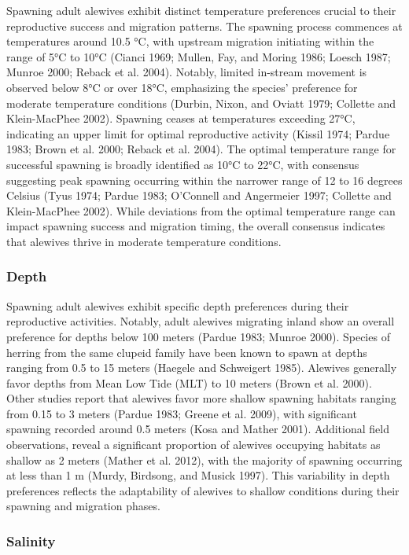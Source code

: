 \documentclass[
]{book}
\begin{document}
Spawning adult alewives exhibit distinct temperature preferences crucial to their reproductive success and migration patterns. The spawning process commences at temperatures around 10.5 °C, with upstream migration initiating within the range of 5°C to 10°C (Cianci 1969; Mullen, Fay, and Moring 1986; Loesch 1987; Munroe 2000; Reback et al. 2004). Notably, limited in-stream movement is observed below 8°C or over 18°C, emphasizing the species' preference for moderate temperature conditions (Durbin, Nixon, and Oviatt 1979; Collette and Klein-MacPhee 2002). Spawning ceases at temperatures exceeding 27°C, indicating an upper limit for optimal reproductive activity (Kissil 1974; Pardue 1983; Brown et al. 2000; Reback et al. 2004). The optimal temperature range for successful spawning is broadly identified as 10°C to 22°C, with consensus suggesting peak spawning occurring within the narrower range of 12 to 16 degrees Celsius (Tyus 1974; Pardue 1983; O'Connell and Angermeier 1997; Collette and Klein-MacPhee 2002). While deviations from the optimal temperature range can impact spawning success and migration timing, the overall consensus indicates that alewives thrive in moderate temperature conditions.

\hypertarget{depth}{%
\subsubsection{Depth}\label{depth}}

Spawning adult alewives exhibit specific depth preferences during their reproductive activities. Notably, adult alewives migrating inland show an overall preference for depths below 100 meters (Pardue 1983; Munroe 2000). Species of herring from the same clupeid family have been known to spawn at depths ranging from 0.5 to 15 meters (Haegele and Schweigert 1985). Alewives generally favor depths from Mean Low Tide (MLT) to 10 meters (Brown et al. 2000). Other studies report that alewives favor more shallow spawning habitats ranging from 0.15 to 3 meters (Pardue 1983; Greene et al. 2009), with significant spawning recorded around 0.5 meters (Kosa and Mather 2001). Additional field observations, reveal a significant proportion of alewives occupying habitats as shallow as 2 meters (Mather et al. 2012), with the majority of spawning occurring at less than 1 m (Murdy, Birdsong, and Musick 1997). This variability in depth preferences reflects the adaptability of alewives to shallow conditions during their spawning and migration phases.

\hypertarget{salinity}{%
\subsubsection{Salinity}\label{salinity}}
\end{document}
